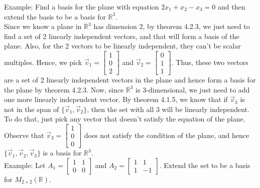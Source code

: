 \documentclass[10pt,letter]{article}
\begin{document}
Example: Find a basis for the plane with equation $2x_1+x_2-x_3=0$ and then extend the basis to be a basis for $\mathbb{R}^3$. \\ 
Since we know a plane in $\mathbb{R}^3$ has dimension 2, by theorem 4.2.3, we just need to find a set of 2 linearly independent vectors, and that will form a basis of the plane. Also, for the 2 vectors to be linearly independent, they can't be scalar multiples. Hence, we pick $\vec{v}_1=\begin{bmatrix}1\\0\\2\end{bmatrix}$ and $\vec{v}_2=\begin{bmatrix}0\\1\\1\end{bmatrix}$. Thus, these two vectors are a set of 2 linearly independent vectors in the plane and hence form a basis for the plane by theorem 4.2.3. Now, since $\mathbb{R}^3$ is 3-dimensional, we just need to add one more linearly independent vector. By theorem 4.1.5, we know that if $\vec{v}_3$ is not in the span of $\{\vec{v}_1,\vec{v}_2\}$, then the set with all 3 will be linearly independent. To do that, just pick any vector that doesn't satisfy the equation of the plane. Observe that $\vec{v}_3=\begin{bmatrix}1\\0\\0\end{bmatrix}$ does not satisfy the condition of the plane, and hence $\{\vec{v}_1,\vec{v}_2,\vec{v}_3\}$ is a basis for $\mathbb{R}^3$. \\ 
Example: Let $A_1=\begin{bmatrix}1&1\\0&0\end{bmatrix}$ and $A_2=\begin{bmatrix}1&1\\1&-1\end{bmatrix}$. Extend the set to be a basis for $M_{2\times 2}(\mathbb{R})$. \\ 
\end{document}
